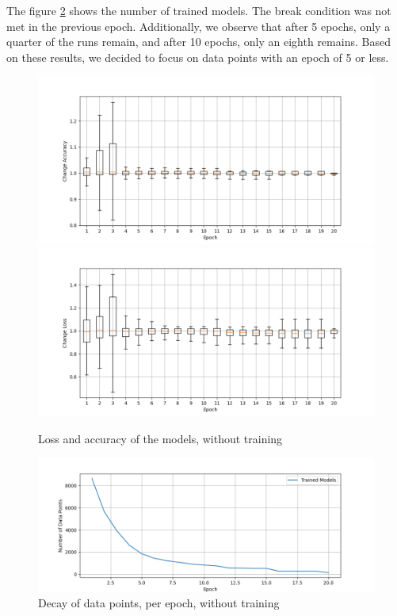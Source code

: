 The figure \ref{fig:decay_Notraining} shows the number of trained models.
The break condition was not met in the previous epoch.
Additionally, we observe that after 5 epochs, only a quarter of the runs remain, and after 10 epochs, only an eighth remains.
Based on these results, we decided to focus on data points with an epoch of 5 or less.
\begin{figure}
    \centering
    \includegraphics[width=\textwidth]{plots/NotTrained_Change_Acc.png}
    \includegraphics[width=\textwidth]{plots/NotTrained_Change_Loss.png}
    \caption{Loss and accuracy of the models, without training}
    \label{fig:loss-accuracy-Notraining}
\end{figure}
\begin{figure}
    \centering
    \includegraphics[width=\textwidth]{plots/NotTrained_Points_perEpoch.png}
    \caption{Decay of data points, per epoch, without training}
    \label{fig:decay_Notraining}
\end{figure}
